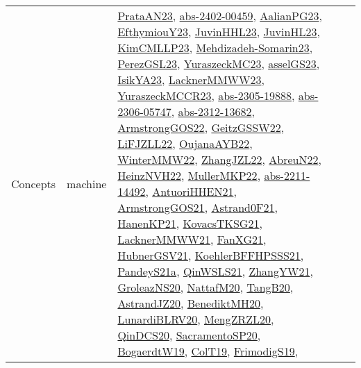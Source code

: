 {\begin{longtable}{llp{6cm}p{6cm}p{6cm}}
Concepts & machine & \href{articles/PrataAN23.pdf}{PrataAN23}\cite{PrataAN23}, \href{articles/abs-2402-00459.pdf}{abs-2402-00459}\cite{abs-2402-00459}, \href{papers/AalianPG23.pdf}{AalianPG23}\cite{AalianPG23}, \href{papers/EfthymiouY23.pdf}{EfthymiouY23}\cite{EfthymiouY23}, \href{papers/JuvinHHL23.pdf}{JuvinHHL23}\cite{JuvinHHL23}, \href{papers/JuvinHL23.pdf}{JuvinHL23}\cite{JuvinHL23}, \href{papers/KimCMLLP23.pdf}{KimCMLLP23}\cite{KimCMLLP23}, \href{papers/Mehdizadeh-Somarin23.pdf}{Mehdizadeh-Somarin23}\cite{Mehdizadeh-Somarin23}, \href{papers/PerezGSL23.pdf}{PerezGSL23}\cite{PerezGSL23}, \href{papers/YuraszeckMC23.pdf}{YuraszeckMC23}\cite{YuraszeckMC23}, \href{papers/asselGS23.pdf}{asselGS23}\cite{asselGS23}, \href{articles/IsikYA23.pdf}{IsikYA23}\cite{IsikYA23}, \href{articles/LacknerMMWW23.pdf}{LacknerMMWW23}\cite{LacknerMMWW23}, \href{articles/YuraszeckMCCR23.pdf}{YuraszeckMCCR23}\cite{YuraszeckMCCR23}, \href{articles/abs-2305-19888.pdf}{abs-2305-19888}\cite{abs-2305-19888}, \href{articles/abs-2306-05747.pdf}{abs-2306-05747}\cite{abs-2306-05747}, \href{articles/abs-2312-13682.pdf}{abs-2312-13682}\cite{abs-2312-13682}, \href{papers/ArmstrongGOS22.pdf}{ArmstrongGOS22}\cite{ArmstrongGOS22}, \href{papers/GeitzGSSW22.pdf}{GeitzGSSW22}\cite{GeitzGSSW22}, \href{papers/LiFJZLL22.pdf}{LiFJZLL22}\cite{LiFJZLL22}, \href{papers/OujanaAYB22.pdf}{OujanaAYB22}\cite{OujanaAYB22}, \href{papers/WinterMMW22.pdf}{WinterMMW22}\cite{WinterMMW22}, \href{papers/ZhangJZL22.pdf}{ZhangJZL22}\cite{ZhangJZL22}, \href{articles/AbreuN22.pdf}{AbreuN22}\cite{AbreuN22}, \href{articles/HeinzNVH22.pdf}{HeinzNVH22}\cite{HeinzNVH22}, \href{articles/MullerMKP22.pdf}{MullerMKP22}\cite{MullerMKP22}, \href{articles/abs-2211-14492.pdf}{abs-2211-14492}\cite{abs-2211-14492}, \href{papers/AntuoriHHEN21.pdf}{AntuoriHHEN21}\cite{AntuoriHHEN21}, \href{papers/ArmstrongGOS21.pdf}{ArmstrongGOS21}\cite{ArmstrongGOS21}, \href{papers/Astrand0F21.pdf}{Astrand0F21}\cite{Astrand0F21}, \href{papers/HanenKP21.pdf}{HanenKP21}\cite{HanenKP21}, \href{papers/KovacsTKSG21.pdf}{KovacsTKSG21}\cite{KovacsTKSG21}, \href{papers/LacknerMMWW21.pdf}{LacknerMMWW21}\cite{LacknerMMWW21}, \href{articles/FanXG21.pdf}{FanXG21}\cite{FanXG21}, \href{articles/HubnerGSV21.pdf}{HubnerGSV21}\cite{HubnerGSV21}, \href{articles/KoehlerBFFHPSSS21.pdf}{KoehlerBFFHPSSS21}\cite{KoehlerBFFHPSSS21}, \href{articles/PandeyS21a.pdf}{PandeyS21a}\cite{PandeyS21a}, \href{articles/QinWSLS21.pdf}{QinWSLS21}\cite{QinWSLS21}, \href{articles/ZhangYW21.pdf}{ZhangYW21}\cite{ZhangYW21}, \href{papers/GroleazNS20.pdf}{GroleazNS20}\cite{GroleazNS20}, \href{papers/NattafM20.pdf}{NattafM20}\cite{NattafM20}, \href{papers/TangB20.pdf}{TangB20}\cite{TangB20}, \href{articles/AstrandJZ20.pdf}{AstrandJZ20}\cite{AstrandJZ20}, \href{articles/BenediktMH20.pdf}{BenediktMH20}\cite{BenediktMH20}, \href{articles/LunardiBLRV20.pdf}{LunardiBLRV20}\cite{LunardiBLRV20}, \href{articles/MengZRZL20.pdf}{MengZRZL20}\cite{MengZRZL20}, \href{articles/QinDCS20.pdf}{QinDCS20}\cite{QinDCS20}, \href{articles/SacramentoSP20.pdf}{SacramentoSP20}\cite{SacramentoSP20}, \href{papers/BogaerdtW19.pdf}{BogaerdtW19}\cite{BogaerdtW19}, \href{papers/ColT19.pdf}{ColT19}\cite{ColT19}, \href{papers/FrimodigS19.pdf}{FrimodigS19}\cite{FrimodigS19}, 
\end{longtable}}
